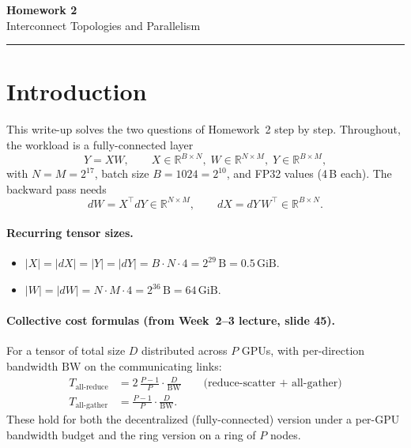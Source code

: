 \documentclass[11pt]{article}
\begin{document}
\begin{center}
    {\LARGE \textbf{Homework 2}}\\[2pt]
    {\normalsize Interconnect Topologies and Parallelism}\\[4pt]
    \rule{\textwidth}{0.4pt}
\end{center}

\section*{Introduction}

This write-up solves the two questions of Homework~2 step by step. Throughout, the
workload is a fully-connected layer
\[
    Y = X W, \qquad X\in\mathbb{R}^{B\times N}, \; W\in\mathbb{R}^{N\times M}, \; Y\in\mathbb{R}^{B\times M},
\]
with $N = M = 2^{17}$, batch size $B = 1024 = 2^{10}$, and FP32 values (4\,B each).
The backward pass needs
\[
    dW = X^{\top} dY \in \mathbb{R}^{N\times M},
    \qquad
    dX = dY\, W^{\top} \in \mathbb{R}^{B\times N}.
\]

\paragraph{Recurring tensor sizes.}
\begin{itemize}[leftmargin=*, itemsep=2pt]
    \item $|X| = |dX| = |Y| = |dY| = B\!\cdot\! N\!\cdot\! 4 = 2^{29}\,\text{B} = 0.5\,\text{GiB}$.
    \item $|W| = |dW| = N\!\cdot\! M\!\cdot\! 4 = 2^{36}\,\text{B} = 64\,\text{GiB}$.
\end{itemize}

\paragraph{Collective cost formulas (from Week~2--3 lecture, slide 45).}
For a tensor of total size $D$ distributed across $P$ GPUs, with per-direction bandwidth
$\mathrm{BW}$ on the communicating links:
\begin{align*}
    T_{\text{all-reduce}} &= 2\,\tfrac{P-1}{P}\cdot\tfrac{D}{\mathrm{BW}}
    \qquad\text{(reduce-scatter + all-gather)} \\
    T_{\text{all-gather}} &= \tfrac{P-1}{P}\cdot\tfrac{D}{\mathrm{BW}}.
\end{align*}
These hold for both the decentralized (fully-connected) version under a per-GPU
bandwidth budget and the ring version on a ring of $P$ nodes.
\end{document}
